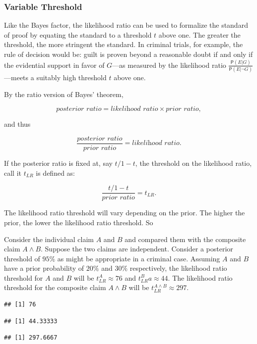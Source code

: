 \documentclass[10pt,dvipsnames,enabledeprecatedfontcommands]{scrartcl}
\newcommand{\pr}[1]{\mathsf{P}(#1)}
\begin{document}
\hypertarget{variable-threshold-1}{%
\subsubsection{Variable Threshold}\label{variable-threshold-1}}

Like the Bayes factor, the likelihood ratio can be used to formalize the
standard of proof by equating the standard to a threshold \(t\) above
one. The greater the threshold, the more stringent the standard. In
criminal trials, for example, the rule of decision would be: guilt is
proven beyond a reasonable doubt if and only if the evidential support
in favor of \(G\)---as measured by the likelihood ratio
\(\frac{\pr{E \vert G}}{\pr{E \vert \neg G}}\)---meets a suitably high
threshold \(t\) above one.

By the ratio version of Bayes' theorem,

\[\textit{posterior ratio} = \textit{likelihood ratio} \times \textit{prior ratio},\]

and thus

\[\frac{\textit{posterior ratio}}{\textit{prior ratio}} = \textit{likelihood ratio}.\]

If the posterior ratio is fixed at, say \(t/1-t\), the threshold on the
likelihood ratio, call it \(t_{LR}\) is defined as:

\[\frac{t/1-t}{\textit{prior ratio}} = t_{LR}.\]

\noindent The likelihood ratio threshold will vary depending on the
prior. The higher the prior, the lower the likelihood ratio threshold.
So

Consider the individual claim \(A\) and \(B\) and compared them with the
composite claim \(A \wedge B\). Suppose the two claims are independent.
Consider a posterior threshold of \(95\%\) as might be appropriate in a
criminal case. Assuming \(A\) and \(B\) have a prior probability of
\(20\%\) and \(30\%\) respectively, the likelihood ratio threshold for
\(A\) and \(B\) will be \(t_{LR}^{A}\approx 76\) and
\(t_{LR}^{B}a\approx 44\). The likelihood ratio threshold for the
composite claim \(A \wedge B\) will be
\(t^{A\wedge B}_{LR}\approx 297\).

\begin{verbatim}
## [1] 76
\end{verbatim}

\begin{verbatim}
## [1] 44.33333
\end{verbatim}

\begin{verbatim}
## [1] 297.6667
\end{verbatim}
\end{document}
